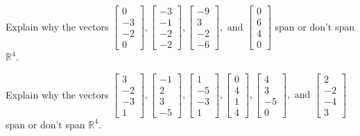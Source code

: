 \documentclass{article}
\begin{document}
\begin{exerciseStatement}
    Explain why the vectors \(\left[\begin{array}{r}
0 \\
-3 \\
-2 \\
0
\end{array}\right] , \left[\begin{array}{r}
-3 \\
-1 \\
-2 \\
-2
\end{array}\right] , \left[\begin{array}{r}
-9 \\
3 \\
-2 \\
-6
\end{array}\right] , \text{ and } \left[\begin{array}{r}
0 \\
6 \\
4 \\
0
\end{array}\right]\) span or don't span \(\mathbb{R}^4\).



  
\end{exerciseStatement}

\begin{exerciseStatement}
    Explain why the vectors \(\left[\begin{array}{r}
3 \\
-2 \\
-3 \\
1
\end{array}\right] , \left[\begin{array}{r}
-1 \\
2 \\
3 \\
-5
\end{array}\right] , \left[\begin{array}{r}
1 \\
-5 \\
-3 \\
1
\end{array}\right] , \left[\begin{array}{r}
0 \\
4 \\
1 \\
4
\end{array}\right] , \left[\begin{array}{r}
4 \\
3 \\
-5 \\
0
\end{array}\right] , \text{ and } \left[\begin{array}{r}
2 \\
-2 \\
-4 \\
3
\end{array}\right]\) span or don't span \(\mathbb{R}^4\).



  
\end{exerciseStatement}
\end{document}
